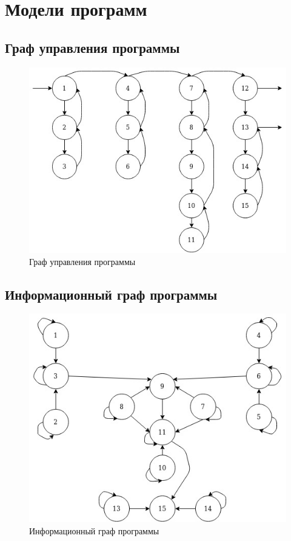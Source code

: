 \documentclass[12pt]{report}
\begin{document}
\chapter{Модели программ}

\section{Граф управления программы}

\begin{figure}[h]
	\centering
	\includegraphics[scale=1]{control_graph.jpg}
	\caption{Граф управления программы}
	\label{fig:mpr}
\end{figure}

\section{Информационный граф программы}

\begin{figure}[h]
	\centering
	\includegraphics[scale=1]{info_graph.jpg}
	\caption{Информационный граф программы}
	\label{fig:mpr}
\end{figure}
\end{document}
